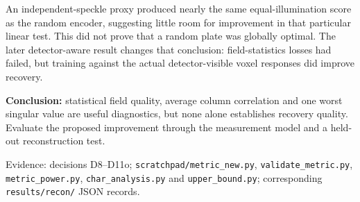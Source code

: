 An independent-speckle proxy produced nearly the same equal-illumination score as the random encoder, suggesting little room for improvement in that particular linear test. This did not prove that a random plate was globally optimal. The later detector-aware result changes that conclusion: field-statistics losses had failed, but training against the actual detector-visible voxel responses did improve recovery.

\textbf{Conclusion:} statistical field quality, average column correlation and one worst singular value are useful diagnostics, but none alone establishes recovery quality. Evaluate the proposed improvement through the measurement model and a held-out reconstruction test.

Evidence: decisions D8--D11o; {\small\texttt{scratchpad/\allowbreak{}metric\_\allowbreak{}new.\allowbreak{}py}}, {\small\texttt{validate\_\allowbreak{}metric.\allowbreak{}py}}, {\small\texttt{metric\_\allowbreak{}power.\allowbreak{}py}}, {\small\texttt{char\_\allowbreak{}analysis.\allowbreak{}py}} and {\small\texttt{upper\_\allowbreak{}bound.\allowbreak{}py}}; corresponding {\small\texttt{results/\allowbreak{}recon/\allowbreak{}}} JSON records.

